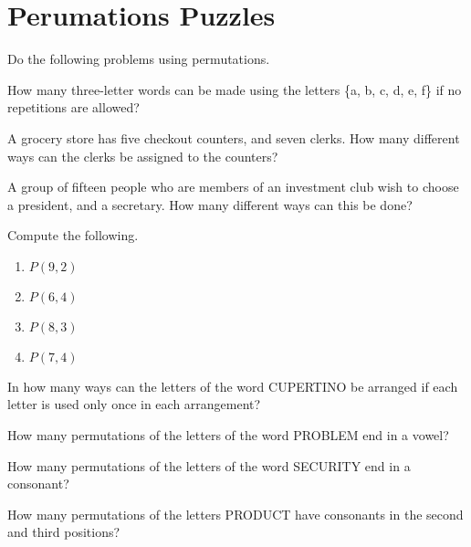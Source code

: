 \section{Perumations Puzzles}

Do the following problems using permutations.

\begin{puzzle}
    How many three-letter words can be made using the letters \{a, b, c, d, e, f\} if no repetitions are allowed?
\end{puzzle}

\begin{puzzle}
    A grocery store has five checkout counters, and seven clerks. How many different ways can the clerks be assigned to the counters?
\end{puzzle}

\begin{puzzle}
    A group of fifteen people who are members of an investment club wish to choose a president, and a secretary. How many different ways can this be done?
\end{puzzle}

\begin{puzzle}
    Compute the following.
    \begin{enumerate}
        \item \( P(9,2) \)
        \item \( P(6,4) \)
        \item \( P(8,3) \)
        \item \( P(7,4) \)
    \end{enumerate}
\end{puzzle}

\begin{puzzle}
    In how many ways can the letters of the word CUPERTINO be arranged if each letter is used only once in each arrangement?
\end{puzzle}

\begin{puzzle}
    How many permutations of the letters of the word PROBLEM end in a vowel?
\end{puzzle}

\begin{puzzle}
    How many permutations of the letters of the word SECURITY end in a consonant?
\end{puzzle}

\begin{puzzle}
    How many permutations of the letters PRODUCT have consonants in the second and third positions?
\end{puzzle}

